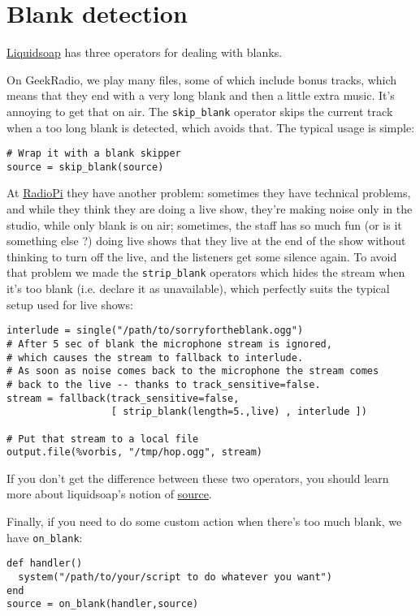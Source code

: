 \documentclass{book}
\begin{document}
\section{Blank detection}
\href{index.html}{Liquidsoap} has three operators for dealing with blanks.

On GeekRadio, we play many files, some of which include bonus tracks, which means that they end with a very long blank and then a little extra music. It's annoying to get that on air. The \verb+skip_blank+ operator skips the current track when a too long blank is detected, which avoids that. The typical usage is simple:

\begin{verbatim}
# Wrap it with a blank skipper
source = skip_blank(source)
\end{verbatim}
At \href{http://www.radiopi.org/}{RadioPi} they have another problem: sometimes they have technical problems, and while they think they are doing a live show, they're making noise only in the studio, while only blank is on air; sometimes, the staff has so much fun (or is it something else ?) doing live shows that they live at the end of the show without thinking to turn off the live, and the listeners get some silence again. To avoid that problem we made the \verb+strip_blank+ operators which hides the stream when it's too blank (i.e. declare it as unavailable), which perfectly suits the typical setup used for live shows:

\begin{verbatim}
interlude = single("/path/to/sorryfortheblank.ogg")
# After 5 sec of blank the microphone stream is ignored,
# which causes the stream to fallback to interlude.
# As soon as noise comes back to the microphone the stream comes
# back to the live -- thanks to track_sensitive=false.
stream = fallback(track_sensitive=false,
	              [ strip_blank(length=5.,live) , interlude ])

# Put that stream to a local file
output.file(%vorbis, "/tmp/hop.ogg", stream)
\end{verbatim}
If you don't get the difference between these two operators, you should
learn more about liquidsoap's notion of \href{sources.html}{source}.

Finally, if you need to do some custom action when there's too much blank, we have \verb+on_blank+:

\begin{verbatim}
def handler()
  system("/path/to/your/script to do whatever you want")
end
source = on_blank(handler,source)
\end{verbatim}
\end{document}
